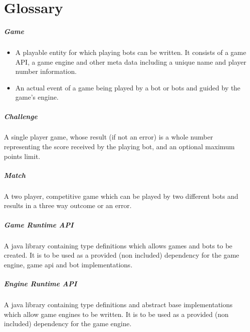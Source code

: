 
%

	\chapter*{Glossary}

	\paragraph{Game}
	\begin{itemize}
		\item A playable entity for which playing bots can be written. It consists of a game API, a game engine and other meta data including a unique name and player number information. 
		
		\item An actual event of a game being played by a bot or bots and guided by the game's engine.
	\end{itemize}
	
	\paragraph{Challenge} A single player game, whose result (if not an error) is a whole number representing the score received by the playing bot, and an optional maximum points limit.
  
  	\paragraph{Match} A two player, competitive game which can be played by two different bots and results in a three way outcome or an error.
  
  	\paragraph{Game Runtime API} A java library containing type definitions which allows games and bots to be created. It is to be used as a provided (non included) dependency for the game engine, game api and bot implementations.
  	
  	\paragraph{Engine Runtime API} A java library containing type definitions and abstract base implementations which allow game engines to be written. It is to be used as a provided (non included) dependency for the game engine.
  
